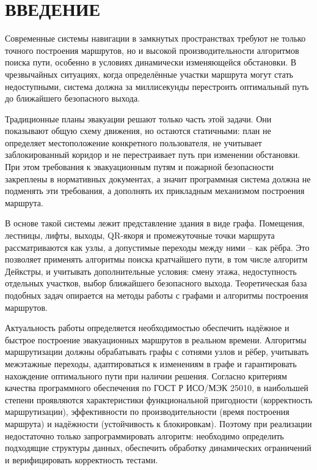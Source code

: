 \section*{ВВЕДЕНИЕ}

Современные системы навигации в замкнутых пространствах требуют не только точного построения маршрутов, но и высокой производительности алгоритмов поиска пути, особенно в условиях динамически изменяющейся обстановки. В чрезвычайных ситуациях, когда определённые участки маршрута могут стать недоступными, система должна за миллисекунды перестроить оптимальный путь до ближайшего безопасного выхода.

Традиционные планы эвакуации решают только часть этой задачи. Они показывают общую схему движения, но остаются статичными: план не определяет местоположение конкретного пользователя, не учитывает заблокированный коридор и не перестраивает путь при изменении обстановки. При этом требования к эвакуационным путям и пожарной безопасности закреплены в нормативных документах, а значит программная система должна не подменять эти требования, а дополнять их прикладным механизмом построения маршрута.

В основе такой системы лежит представление здания в виде графа. Помещения, лестницы, лифты, выходы, QR-якоря и промежуточные точки маршрута рассматриваются как узлы, а допустимые переходы между ними – как рёбра. Это позволяет применять алгоритмы поиска кратчайшего пути, в том числе алгоритм Дейкстры, и учитывать дополнительные условия: смену этажа, недоступность отдельных участков, выбор ближайшего безопасного выхода. Теоретическая база подобных задач опирается на методы работы с графами и алгоритмы построения маршрутов.

Актуальность работы определяется необходимостью обеспечить надёжное и быстрое построение эвакуационных маршрутов в реальном времени. Алгоритмы маршрутизации должны обрабатывать графы с сотнями узлов и рёбер, учитывать межэтажные переходы, адаптироваться к изменениям в графе и гарантировать нахождение оптимального пути при наличии решения. Согласно критериям качества программного обеспечения по ГОСТ Р ИСО/МЭК 25010, в наибольшей степени проявляются характеристики функциональной пригодности (корректность маршрутизации), эффективности по производительности (время построения маршрута) и надёжности (устойчивость к блокировкам). Поэтому при реализации недостаточно только запрограммировать алгоритм: необходимо определить подходящие структуры данных, обеспечить обработку динамических ограничений и верифицировать корректность тестами.

